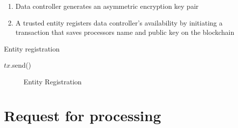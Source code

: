 \begin{enumerate}
  \item Data controller generates an asymmetric encryption key pair
  \item A trusted entity registers data controller's availability by initiating a transaction that saves processors name and public key on the blockchain
\end{enumerate}

\begin{algorithm}[!htb]
  \caption{Entity registration}\label{alg:entity_registration}
  \begin{algorithmic}[1]
    \State $tx$.send()
    \State {}
  \EndProcedure
  \end{algorithmic}
\end{algorithm}

\begin{figure}[ht!]
  \caption{Entity Registration}
  \label{fig:arch:entity_reg}
\end{figure}

\section{Request for processing}
\label{solution:flow:pr_req}

